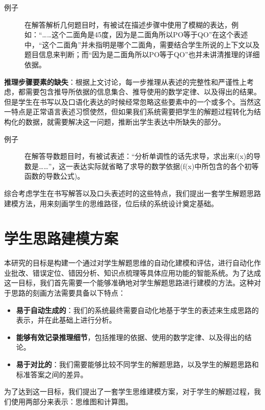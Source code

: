 \begin{description}
    \item[例子] 在解答解析几何题目时，有被试在描述步骤中使用了模糊的表达，例如：“……这个二面角是45度，因为是二面角所以PO等于QO”在这个表述中，“这个二面角”并未指明是哪个二面角，需要结合学生所说的上下文以及题目信息来判断；而“因为是二面角所以PO等于QO”也并未讲清推理的详细依据。
\end{description}

\textbf{推理步骤要素的缺失}：根据上文讨论，每一步推理从表述的完整性和严谨性上考虑，都需要包含推导所依据的信息集合、推导使用的数学定律、以及得出的结果。但是学生在书写以及口语化表达的时候经常忽略这些要素中的一个或多个。当然这一特点是正常语言表述习惯使然，但如果我们系统需要把学生的解题过程转化为结构化的数据，就需要解决这一问题，推断出学生表达中所缺失的部分。

\begin{description}
    \item[例子] 在解答导数题目时，有被试表述：“分析单调性的话先求导，求出来f(x)的导数是……”，这一表达实际就省略了求导的数学依据(f(x)中所包含的各个初等函数的导数公式)。
\end{description}

综合考虑学生在书写解答以及口头表述时的这些特点，我们提出一套学生解题思路建模方法，用来刻画学生的思维路径，位后续的系统设计奠定基础。

\section{学生思路建模方案}

本研究的目标是构建一个通过对学生解题思维的自动化建模和评估，进行自动化作业批改、错误定位、错因分析、知识点梳理等具体应用功能的智能系统。为了达成这一目标，我们首先需要一个能够准确地对学生解题思路进行建模的方法。这种对于思路的刻画方法需要具备以下特点：

\begin{itemize}
    \item \textbf{易于自动生成的}：我们的系统最终需要自动化地基于学生的表述来生成思路的表示，并在此基础上进行分析。
    \item \textbf{能够有效记录推理细节}，包括推理的依据、使用的数学定律、以及得出的结论。
    \item \textbf{易于对比的}：我们需要能够比较不同学生的解题思路，以及学生的解题思路和标准答案之间的差异。
\end{itemize}

为了达到这一目标，我们提出了一套学生思维建模方案，对于学生的解题过程，我们使用两部分来表示：思维图和计算图。

